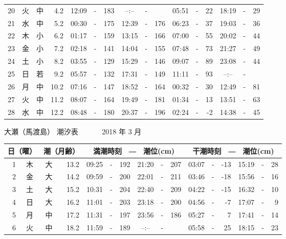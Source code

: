 \documentclass[12pt.a4j]{jsarticle}
\begin{document}
\begin{center}
\begin{table}[ht]
\begin{tabular}{|rc|cr|ccrccr|ccrccr|}
20 & 火 & 中 &  4.2 &  12:09 &-& 183  &  --:-- &-&     &   05:51 &-&  22  &   18:19 &-&  29  \\
21 & 水 & 中 &  5.2 &  00:30 &-& 175  &  12:39 &-& 176  &   06:23 &-&  37  &   19:03 &-&  36  \\
22 & 木 & 小 &  6.2 &  01:17 &-& 159  &  13:15 &-& 166  &   07:00 &-&  55  &   20:02 &-&  44  \\
23 & 金 & 小 &  7.2 &  02:18 &-& 141  &  14:04 &-& 155  &   07:48 &-&  73  &   21:27 &-&  49  \\
24 & 土 & 小 &  8.2 &  03:55 &-& 129  &  15:29 &-& 146  &   09:07 &-&  89  &   23:08 &-&  44  \\
25 & 日 & 若 &  9.2 &  05:57 &-& 132  &  17:31 &-& 149  &   11:11 &-&  93  &   --:-- &-&     \\
26 & 月 & 中 & 10.2 &  07:16 &-& 147  &  18:52 &-& 164  &   00:32 &-&  30  &   12:49 &-&  81  \\
27 & 火 & 中 & 11.2 &  08:07 &-& 164  &  19:49 &-& 181  &   01:34 &-&  13  &   13:51 &-&  63  \\
28 & 水 & 中 & 12.2 &  08:48 &-& 180  &  20:37 &-& 196  &   02:24 &-&  -2  &   14:38 &-&  45  \\
   \hline
   \end{tabular}
\end{table}
\newpage
 {\LARGE 大瀬（馬渡島）  潮汐表　　　}
 {\large 2018 年  3 月}\\
 \begin{table}[ht]
    \begin{tabular}{|rc|cr|ccrccr|ccrccr|}
    \hline
    \multicolumn{2}{|c|}{日（曜）} & \multicolumn{2}{c|}{潮（月齢）} & \multicolumn{6}{c|}{満潮時刻　―　潮位(cm)} & \multicolumn{6}{c|}{干潮時刻　―　潮位(cm)} \\
 \hline
 1 & 木 & 大 & 13.2 &  09:25 &-& 192  &  21:20 &-& 207  &   03:07 &-& -13  &   15:19 &-&  28  \\
 2 & 金 & 大 & 14.2 &  09:59 &-& 200  &  22:01 &-& 211  &   03:46 &-& -18  &   15:56 &-&  16  \\
 3 & 土 & 大 & 15.2 &  10:31 &-& 204  &  22:40 &-& 209  &   04:22 &-& -15  &   16:32 &-&  10  \\
 4 & 日 & 大 & 16.2 &  11:01 &-& 203  &  23:18 &-& 200  &   04:56 &-&  -7  &   17:07 &-&   9  \\
 5 & 月 & 中 & 17.2 &  11:31 &-& 197  &  23:56 &-& 186  &   05:27 &-&   7  &   17:41 &-&  14  \\
 6 & 火 & 中 & 18.2 &  11:59 &-& 189  &  --:-- &-&     &   05:58 &-&  25  &   18:15 &-&  23  \\

\end{tabular}
\end{table}
\end{center}
\end{document}
